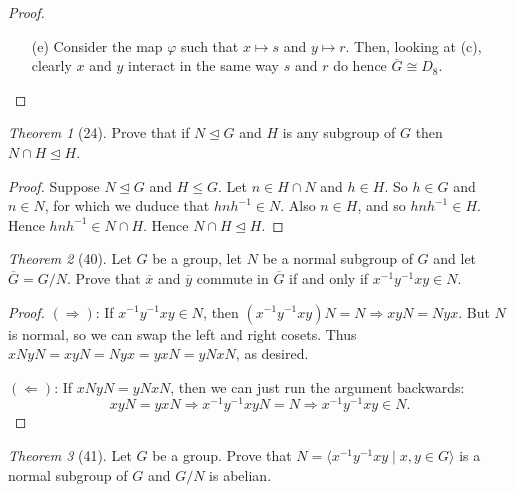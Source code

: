 \documentclass[12pt]{article}
\theoremstyle{remark}
\theoremstyle{named}
\newtheorem*{theorem}{Theorem}
\renewcommand{\bar}{\overline}
\renewcommand{\implies}{\Rightarrow}
\newcommand{\coimplies}{\Leftarrow}
\newcommand{\normal}{\trianglelefteq}
\begin{document}
\begin{proof}
\begin{enumerate}
        \item[(e)] Consider the map \(\varphi\) such that \(x \mapsto s\) and \(y \mapsto r\). Then, looking at (c), clearly \(x\) and \(y\) interact in the same way \(s\) and \(r\) do hence \(\overline{G} \cong D_8\).
    \end{enumerate}
\end{proof}

\begin{theorem}[24]
    Prove that if \(N \normal G\) and \(H\) is any subgroup of \(G\) then \(N \cap H \normal H\).
\end{theorem}

\begin{proof}
    Suppose \(N \normal G\) and \(H \le G\). Let \(n \in H \cap N\) and \(h \in H\). So \(h \in G\) and \(n \in N\), for which we duduce that \(hnh^{-1} \in N\). Also \(n \in H\), and so \(hnh^{-1} \in H\). Hence \(hnh^{-1} \in N \cap H\). Hence \(N \cap H \normal H\). 
\end{proof}

\begin{theorem}[40]
    Let \(G\) be a group, let \(N\) be a normal subgroup of \(G\) and let \(\bar{G} = G / N\). Prove that \(\bar x\) and \(\bar y\) commute in \(\bar G\) if and only if \(x^{-1}y^{-1}xy \in N\).
\end{theorem}

\begin{proof}
    \((\implies)\): If \(x^{-1}y^{-1}xy \in N\), then \((x^{-1}y^{-1}xy)N = N \implies xyN = Nyx\). But \(N\) is normal, so we can swap the left and right cosets. Thus \(xN yN = xyN = N yx = yx N = yN xN\), as desired.

    \((\coimplies)\): If \(xN yN = yN xN\), then we can just run the argument backwards:
    \[xyN = yxN \implies x^{-1}y^{-1}xyN = N \implies x^{-1}y^{-1}xy \in N.\]
\end{proof}

\begin{theorem}[41]
    Let \(G\) be a group. Prove that \(N = \langle x^{-1}y^{-1}xy \mid x, y \in G \rangle\) is a normal subgroup of \(G\) and \(G/N\) is abelian. 
\end{theorem}
\end{document}
